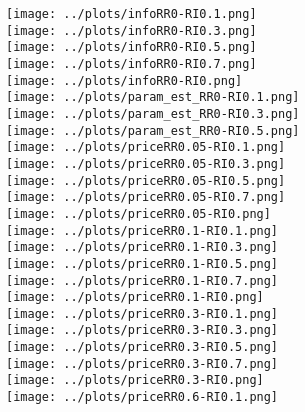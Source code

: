 \documentclass[a4paper, 11pt]{report}
\begin{document}
\texttt{[image: ../plots/infoRR0-RI0.1.png]}\\
\texttt{[image: ../plots/infoRR0-RI0.3.png]}\\
\texttt{[image: ../plots/infoRR0-RI0.5.png]}\\
\texttt{[image: ../plots/infoRR0-RI0.7.png]}\\
\texttt{[image: ../plots/infoRR0-RI0.png]}\\
\texttt{[image: ../plots/param\_est\_RR0-RI0.1.png]}\\
\texttt{[image: ../plots/param\_est\_RR0-RI0.3.png]}\\
\texttt{[image: ../plots/param\_est\_RR0-RI0.5.png]}\\
\texttt{[image: ../plots/priceRR0.05-RI0.1.png]}\\
\texttt{[image: ../plots/priceRR0.05-RI0.3.png]}\\
\texttt{[image: ../plots/priceRR0.05-RI0.5.png]}\\
\texttt{[image: ../plots/priceRR0.05-RI0.7.png]}\\
\texttt{[image: ../plots/priceRR0.05-RI0.png]}\\
\texttt{[image: ../plots/priceRR0.1-RI0.1.png]}\\
\texttt{[image: ../plots/priceRR0.1-RI0.3.png]}\\
\texttt{[image: ../plots/priceRR0.1-RI0.5.png]}\\
\texttt{[image: ../plots/priceRR0.1-RI0.7.png]}\\
\texttt{[image: ../plots/priceRR0.1-RI0.png]}\\
\texttt{[image: ../plots/priceRR0.3-RI0.1.png]}\\
\texttt{[image: ../plots/priceRR0.3-RI0.3.png]}\\
\texttt{[image: ../plots/priceRR0.3-RI0.5.png]}\\
\texttt{[image: ../plots/priceRR0.3-RI0.7.png]}\\
\texttt{[image: ../plots/priceRR0.3-RI0.png]}\\
\texttt{[image: ../plots/priceRR0.6-RI0.1.png]}\\
\end{document}
